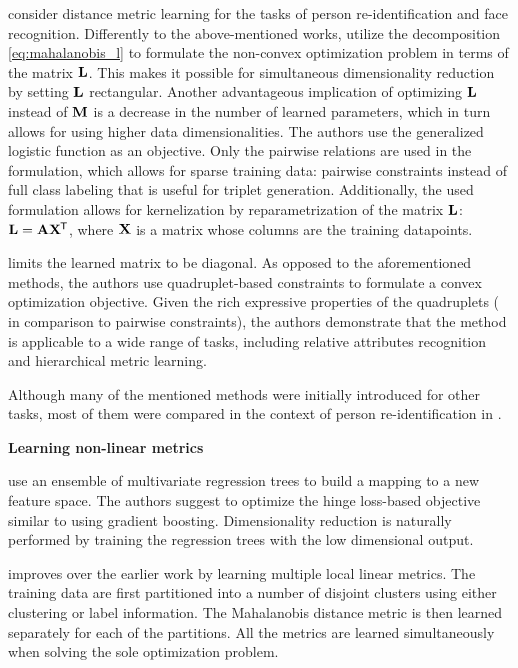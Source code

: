 \citep{mignon2012pcca} consider distance metric learning for the tasks of person re-identification and face recognition.
Differently to the above-mentioned works, \citep{mignon2012pcca} utilize the decomposition \ref{eq:mahalanobis_l} to formulate the non-convex optimization problem in terms of the matrix $\bold{L}$. This makes it possible for simultaneous dimensionality reduction by setting $\bold{L}$ rectangular. Another advantageous implication of optimizing $\bold{L}$ instead of $\bold{M}$ is a decrease in the number of learned parameters, which in turn allows for using higher data dimensionalities. The authors use the generalized logistic function as an objective. Only the pairwise relations are used in the formulation, which allows for sparse training data: pairwise constraints instead of full class labeling that is useful for triplet generation. Additionally, the used formulation allows for kernelization by reparametrization of the matrix $\bold{L}$: $\bold{L} = \bold{A}\bold{X}^{\mkern-1.5mu\mathsf{T}}$, where $\bold{X}$ is a matrix whose columns are the training datapoints.  

\citep{law2013quadruplet} limits the learned matrix to be diagonal. As opposed to the aforementioned methods, the authors use quadruplet-based constraints to formulate a convex optimization objective. Given the rich expressive properties of the quadruplets (\eg{} in comparison to pairwise constraints), the authors demonstrate that the method is applicable to a wide range of tasks, including relative attributes recognition and hierarchical metric learning.

Although many of the mentioned methods were initially introduced for other tasks, most of them were compared in the context of person re-identification in \citep{roth2014mahalanobis}.

\bigskip\ident\textbf{Learning non-linear metrics}

\citep{NIPS2012_4840} use an ensemble of multivariate regression trees to build a mapping to a new feature space. The authors suggest to optimize the hinge loss-based objective similar to \citep{NIPS2005_2795} using gradient boosting. Dimensionality reduction is naturally performed by training the regression trees with the low dimensional output.

\citep{weinberger2009distance} improves over the earlier work  \citep{NIPS2005_2795} by learning multiple local linear metrics. The training data are first partitioned into a number of disjoint clusters using either clustering or label information. The Mahalanobis distance metric is then learned separately for each of the partitions. All the metrics are learned simultaneously when solving the sole optimization problem. 

